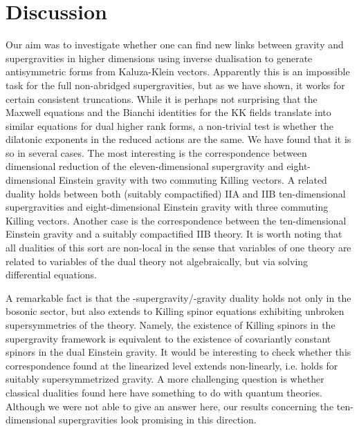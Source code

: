 \documentclass[a4paper,12pt]{article}
\begin{document}
\section{Discussion}
Our aim was to investigate whether one can find new links
between gravity and supergravities in higher dimensions using
inverse dualisation to generate antisymmetric forms from
Kaluza-Klein vectors. Apparently this is an impossible task for
the full non-abridged supergravities, but as we have shown, it
works for certain consistent truncations. While it is perhaps
not surprising that the Maxwell equations and the Bianchi
identities for the KK fields translate into similar equations
for dual higher rank forms, a non-trivial test is whether the
dilatonic exponents in the reduced actions are the same. We
have found that it is so in several cases. The most interesting
is the correspondence between \coordHE{} dimensional reduction of
the eleven-dimensional supergravity and eight-dimensional
Einstein gravity with two commuting Killing vectors. A related
duality holds between both (suitably compactified) IIA and IIB
ten-dimensional supergravities and eight-dimensional Einstein
gravity with three commuting Killing vectors. Another case is
the correspondence between the ten-dimensional Einstein gravity
and a suitably compactified IIB theory. It is worth noting that
all dualities of this sort are non-local in the sense that
variables of one theory are related to  variables of the dual
theory not algebraically, but via solving differential
equations.

A remarkable fact is that the \coordHE{}-supergravity/\coordHE{}-gravity
duality holds not only in the bosonic sector, but also extends
to Killing spinor equations exhibiting unbroken supersymmetries
of the \coordHE{} theory. Namely, the existence of Killing spinors
in the supergravity framework is equivalent to the existence of
covariantly constant spinors in the dual Einstein gravity. It
would be interesting to check whether this correspondence found
at the linearized level extends non-linearly, i.e. holds for
suitably supersymmetrized \coordHE{} gravity. A more challenging
question is whether classical dualities found here have
something to do with quantum theories. Although we were not
able to give an answer here, our results concerning the
ten-dimensional supergravities look promising in this direction.
\end{document}
